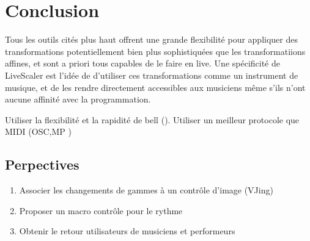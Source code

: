 \section{Conclusion}

Tous les outils cités plus haut offrent une grande flexibilité pour appliquer des transformations potentiellement bien plus sophistiquées que les transformatiions affines, et sont a priori tous capables de le faire en live. Une spécificité de LiveScaler est l'idée de d'utiliser ces transformations comme un instrument de musique, et de les rendre directement accessibles aux musiciens même s'ils n'ont aucune affinité avec la programmation.

Utiliser la flexibilité et la rapidité de bell (\cite{agostini2020programmer}). Utiliser un meilleur protocole que MIDI (OSC,MP \cite{goudard2017mapping})
\subsection{Perpectives}
\begin{enumerate}
  \item Associer les changements de gammes à un contrôle d'image (VJing)
  \item Proposer un macro contrôle pour le rythme
  \item Obtenir le retour utilisateurs de musiciens et performeurs
\end{enumerate}